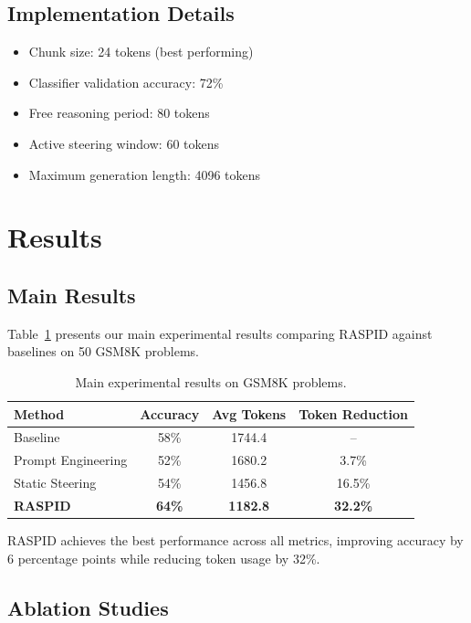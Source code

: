 \documentclass{article}
\begin{document}
\subsection{Implementation Details}

\begin{itemize}
\item Chunk size: 24 tokens (best performing)
\item Classifier validation accuracy: 72\%
\item Free reasoning period: 80 tokens
\item Active steering window: 60 tokens
\item Maximum generation length: 4096 tokens
\end{itemize}

\section{Results}

\subsection{Main Results}

Table~\ref{tab:main_results} presents our main experimental results comparing RASPID against baselines on 50 GSM8K problems.

\begin{table}[ht]
\centering
\begin{tabular}{lccc}
\toprule
Method & Accuracy & Avg Tokens & Token Reduction \\
\midrule
Baseline & 58\% & 1744.4 & -- \\
Prompt Engineering & 52\% & 1680.2 & 3.7\% \\
Static Steering & 54\% & 1456.8 & 16.5\% \\
\textbf{RASPID} & \textbf{64\%} & \textbf{1182.8} & \textbf{32.2\%} \\
\bottomrule
\end{tabular}
\caption{Main experimental results on GSM8K problems.}
\label{tab:main_results}
\end{table}

RASPID achieves the best performance across all metrics, improving accuracy by 6 percentage points while reducing token usage by 32\%.

\subsection{Ablation Studies}
\end{document}
